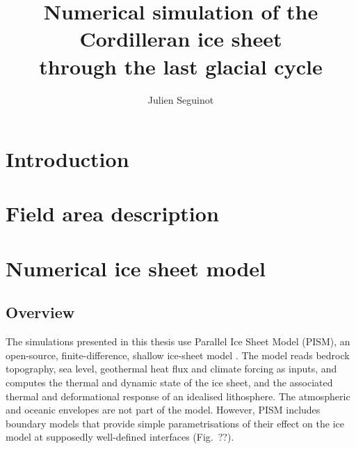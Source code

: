 \documentclass{article}
\title{Numerical simulation of the Cordilleran ice sheet \\
       through the last glacial cycle}
\author{Julien Seguinot}
\begin{document}

\maketitle
\linenumbers

\section{Introduction}


\section{Field area description}


\section{Numerical ice sheet model}

\subsection{Overview}

The simulations presented in this thesis use Parallel Ice Sheet Model (PISM),
an open-source, finite-difference, shallow ice-sheet model
\citep{PISM-authors.2014}. The model reads bedrock topography, sea level,
geothermal heat flux and climate forcing as inputs, and computes the thermal
and dynamic state of the ice sheet, and the associated thermal and
deformational response of an idealised lithosphere. The atmospheric and oceanic
envelopes are not part of the model. However, PISM includes boundary models
that provide simple parametrisations of their effect on the ice model at
supposedly well-defined interfaces (Fig.~??).
\end{document}
